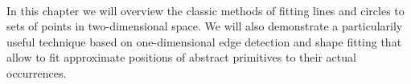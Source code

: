 \paragraph*{}
In this chapter we will overview the classic methods of fitting lines and circles to sets of points in two-dimensional space. We will also demonstrate a particularily useful technique based on one-dimensional edge detection and shape fitting that allow to fit approximate positions of abstract primitives to their actual occurrences.